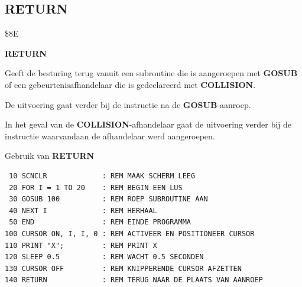\subsection{RETURN}
\begin{description}[leftmargin=2cm,style=nextline]
\item [Token:]    \$8E

\item [Formaat:]   {\bf RETURN}

\item [Gebruik:]    Geeft de besturing terug vanuit een subroutine die is aangeroepen met {\bf GOSUB} of een gebeurtenisafhandelaar die is gedeclareerd met {\bf COLLISION}.

                  De uitvoering gaat verder bij de instructie na de {\bf GOSUB}-aanroep.

                  In het geval van de {\bf COLLISION}-afhandelaar gaat de uitvoering verder bij de instructie waarvandaan de afhandelaar werd aangeroepen.

\item [Voorbeeld:]  Gebruik van {\bf RETURN}

\begin{tcolorbox}[colback=black,coltext=white]
\verbatimfont{\codefont}
\begin{verbatim}
 10 SCNCLR             : REM MAAK SCHERM LEEG
 20 FOR I = 1 TO 20    : REM BEGIN EEN LUS
 30 GOSUB 100          : REM ROEP SUBROUTINE AAN
 40 NEXT I             : REM HERHAAL
 50 END                : REM EINDE PROGRAMMA
100 CURSOR ON, I, I, 0 : REM ACTIVEER EN POSITIONEER CURSOR
110 PRINT "X";         : REM PRINT X
120 SLEEP 0.5          : REM WACHT 0.5 SECONDEN
130 CURSOR OFF         : REM KNIPPERENDE CURSOR AFZETTEN
140 RETURN             : REM TERUG NAAR DE PLAATS VAN AANROEP
\end{verbatim}
\end{tcolorbox}
\end{description}


\newpage
